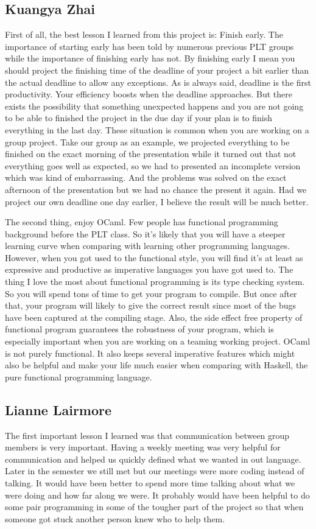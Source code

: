 \subsection{Kuangya Zhai}
First of all, the best lesson I learned from this project is: Finish early. The importance of starting early has been told by numerous previous PLT groups while the importance of finishing early has not. By finishing early I mean you should project the finishing time of the deadline of your project a bit earlier than the actual deadline to allow any exceptions. As is always said, deadline is the first productivity. Your efficiency boosts when the deadline approaches. But there exists the possibility that something unexpected happens and you are not going to be able to finished the project in the due day if your plan is to finish everything in the last day. These situation is common when you are working on a group project. Take our group as an example, we projected everything to be finished on the exact morning of the presentation while it turned out that not everything goes well as expected, so we had to presented an incomplete version which was kind of embarrassing. And the problems was solved on the exact afternoon of the presentation but we had no chance the present it again. Had we project our own deadline one day earlier, I believe the result will be much better. 

The second thing, enjoy OCaml. Few people has functional programming background before the PLT class. So it's likely that you will have a steeper learning curve when comparing with learning other programming languages. However, when you got used to the functional style, you will find it's at least as expressive and productive as imperative languages you have got used to. The thing I love the most about functional programming is its type checking system. So you will spend tons of time to get your program to compile. But once after that, your program will likely to give the correct result since most of the bugs have been captured at the compiling stage. Also, the side effect free property of functional program guarantees the robustness of your program, which is especially important when you are working on a teaming working project. OCaml is not purely functional. It also keeps several imperative features which might also be helpful and make your life much easier when comparing with Haskell, the pure functional programming language. 


\subsection{Lianne Lairmore}
The first important lesson I learned was that communication between group members is very important. Having a weekly meeting 
was very helpful for communication and helped us quickly defined what we wanted in out language. Later in the semester we still
met but our meetings were more coding instead of talking. It would have been better to spend more time talking about what we were 
doing and how far along we were. It probably would have been helpful to do some pair programming in some of the tougher part of the 
project so that when someone got stuck another person knew who to help them. 

